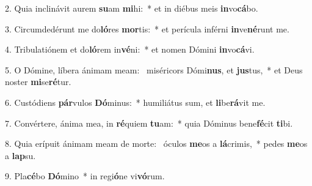 2. Quia inclinávit aurem \textbf{su}am \textbf{mi}hi:~*  et in diébus meis \textbf{in}vo\textbf{cá}bo.\

3. Circumdedérunt me do\textbf{ló}res \textbf{mor}tis:~*  et perícula inférni \textbf{in}ve\textbf{né}runt me.\

4. Tribulatiónem et do\textbf{ló}rem in\textbf{vé}ni:~*  et nomen Dómini \textbf{in}vo\textbf{cá}vi.\

5. O Dómine, líbera ánimam meam: \dag\  miséricors Dómi\textbf{nus}, et \textbf{jus}tus,~*  et Deus noster \textbf{mi}se\textbf{ré}tur.\

6. Custódiens \textbf{pár}vulos \textbf{Dó}minus:~*  humiliátus sum, et \textbf{li}be\textbf{rá}vit me.\

7. Convértere, ánima mea, in \textbf{ré}quiem \textbf{tu}am:~*  quia Dóminus bene\textbf{fé}cit \textbf{ti}bi.\

8. Quia erípuit ánimam meam de morte: \dag\  óculos \textbf{me}os a \textbf{lá}crimis,~*  pedes \textbf{me}os a \textbf{lap}su.\

9. Pla\textbf{cé}bo \textbf{Dó}mino~*  in regi\textbf{ó}ne vi\textbf{vó}rum.\

